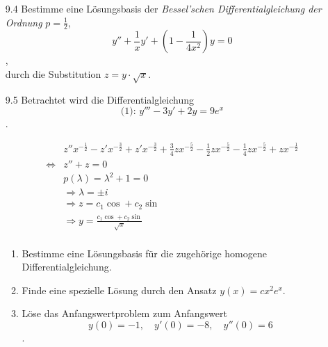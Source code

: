 \documentclass{../HM}
\begin{document}
\begin{enumerate}
		\item [9.4] Bestimme eine Lösungsbasis der \textit{Bessel'schen Differentialgleichung der Ordnung} $p=\frac{1}{2}$,
		$$y''+\frac{1}{x}y'+(1-\frac{1}{4x^2})y=0$$,\\
		durch die Substitution $z=y\cdot\sqrt{x}$.
		
		\item [9.5] Betrachtet wird die Differentialgleichung
		$$\text{(1): }y'''-3y'+2y=9e^x$$.\\
		
		\begin{eqnn}
		\end{eqnn}
		\begin{align*}
			&z''x^{-\frac{1}{2}}-z'x^{-\frac{3}{2}}+z'x^{-\frac{3}{2}}+\frac{3}{4}zx^{-\frac{5}{2}}-\frac{1}{2}zx^{-\frac{5}{2}}-\frac{1}{4}zx^{-\frac{5}{2}}+zx^{-\frac{1}{2}}\\
			\Leftrightarrow &z''+ z = 0\\
			&p(\lambda)=\lambda^2+1=0\\
			&\Rightarrow\lambda=\pm i\\
			&\Rightarrow z=c_1\cos+c_2\sin\\
			&\Rightarrow y=\frac{c_1\cos+c_2\sin}{\sqrt{x}}\\
		\end{align*}
		\begin{enumerate}
			\item Bestimme eine Lösungsbasis für die zugehörige homogene Differentialgleichung.
			
			\item Finde eine spezielle Lösung durch den Ansatz $y(x)=cx^2e^x$.
			
			\item Löse das Anfangswertproblem zum Anfangswert
			$$y(0)=-1,\quad y'(0)=-8,\quad y''(0)=6$$.
		\end{enumerate}
	\end{enumerate}
\end{document}

